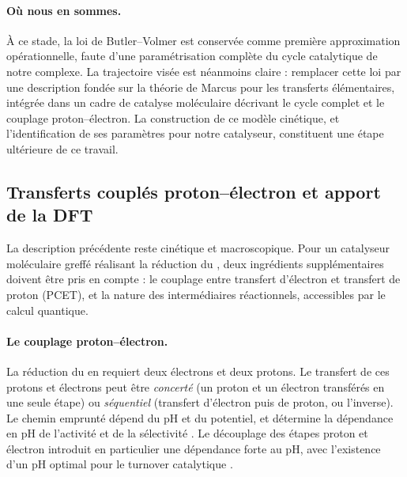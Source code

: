 \paragraph{Où nous en sommes.}
À ce stade, la loi de Butler--Volmer est conservée comme première
approximation opérationnelle, faute d'une paramétrisation complète du cycle
catalytique de notre complexe. La trajectoire visée est néanmoins claire :
remplacer cette loi par une description fondée sur la théorie de Marcus pour
les transferts élémentaires, intégrée dans un cadre de catalyse moléculaire
décrivant le cycle complet et le couplage proton--électron. La construction de
ce modèle cinétique, et l'identification de ses paramètres pour notre
catalyseur, constituent une étape ultérieure de ce travail.


\subsection*{Transferts couplés proton--électron et apport de la DFT}

La description précédente reste cinétique et macroscopique. Pour un
catalyseur moléculaire greffé réalisant la réduction du , deux
ingrédients supplémentaires doivent être pris en compte : le couplage entre
transfert d'électron et transfert de proton (PCET), et la nature des
intermédiaires réactionnels, accessibles par le calcul quantique.

\paragraph{Le couplage proton--électron.}
La réduction du  en  requiert deux électrons et deux protons.
Le transfert de ces protons et électrons peut être \emph{concerté} (un proton
et un électron transférés en une seule étape) ou \emph{séquentiel} (transfert
d'électron puis de proton, ou l'inverse). Le chemin emprunté dépend du pH et
du potentiel, et détermine la dépendance en pH de l'activité et de la
sélectivité \cite{koperTheoryMultipleProton2013}. Le découplage des étapes
proton et électron introduit en particulier une dépendance forte au pH, avec
l'existence d'un pH optimal pour le turnover catalytique
\cite{koperTheoryMultipleProton2013}.

